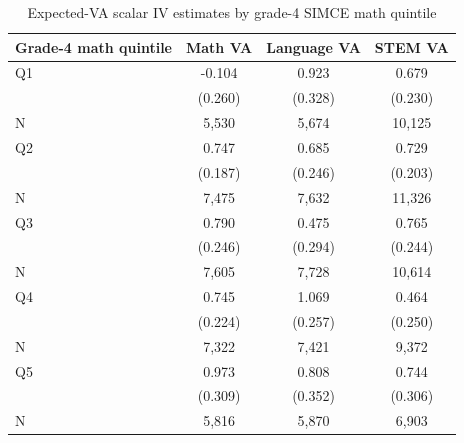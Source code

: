 \begin{table}[!htbp]
\centering
\caption{Expected-VA scalar IV estimates by grade-4 SIMCE math quintile}
\label{tab:scalar_school_value_iv_expected_va_by_simce4_math_quintile}
\begin{tabular}{lccc}
\toprule
Grade-4 math quintile & Math VA & Language VA & STEM VA \\
\midrule
Q1 & -0.104 & 0.923 & 0.679 \\
 & (0.260) & (0.328) & (0.230) \\
N & 5,530 & 5,674 & 10,125 \\
Q2 & 0.747 & 0.685 & 0.729 \\
 & (0.187) & (0.246) & (0.203) \\
N & 7,475 & 7,632 & 11,326 \\
Q3 & 0.790 & 0.475 & 0.765 \\
 & (0.246) & (0.294) & (0.244) \\
N & 7,605 & 7,728 & 10,614 \\
Q4 & 0.745 & 1.069 & 0.464 \\
 & (0.224) & (0.257) & (0.250) \\
N & 7,322 & 7,421 & 9,372 \\
Q5 & 0.973 & 0.808 & 0.744 \\
 & (0.309) & (0.352) & (0.306) \\
N & 5,816 & 5,870 & 6,903 \\
\bottomrule
\end{tabular}
\end{table}
